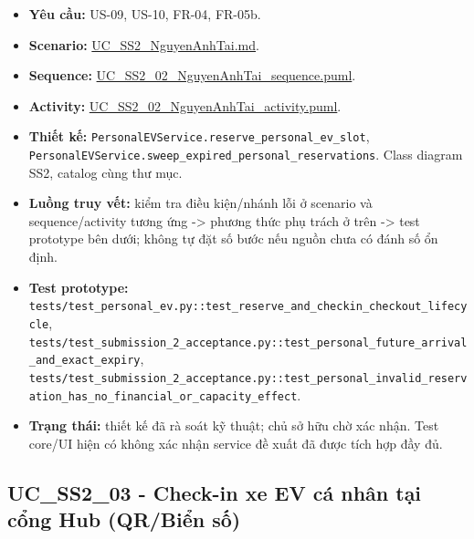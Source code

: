 \documentclass[11pt,a4paper]{article}
\providecommand{\tightlist}{%
  \setlength{\itemsep}{0pt}\setlength{\parskip}{0pt}}
\begin{document}
\begin{itemize}
\tightlist
\item
  \textbf{Yêu cầu:} US-09, US-10, FR-04, FR-05b.
\item
  \textbf{Scenario:}
  \href{../../../../docs/diagrams/Use-case\%20detail-scenario/SS2/Usecase\%20scenario/UC_SS2_NguyenAnhTai.md}{UC\_SS2\_NguyenAnhTai.md}.
\item
  \textbf{Sequence:}
  \href{../../../../docs/diagrams/Use-case\%20detail-scenario/SS2/Sequence\%20diagrams/UC_SS2_02_NguyenAnhTai_sequence.puml}{UC\_SS2\_02\_NguyenAnhTai\_sequence.puml}.
\item
  \textbf{Activity:}
  \href{../../../../docs/diagrams/Use-case\%20detail-scenario/SS2/Activity\%20diagrams/UC_SS2_02_NguyenAnhTai_activity.puml}{UC\_SS2\_02\_NguyenAnhTai\_activity.puml}.
\item
  \textbf{Thiết kế:}
  \texttt{PersonalEVService.reserve\_personal\_ev\_slot},
  \texttt{PersonalEVService.sweep\_expired\_personal\_reservations}.
  Class diagram SS2, catalog cùng thư mục.
\item
  \textbf{Luồng truy vết:} kiểm tra điều kiện/nhánh lỗi ở scenario và
  sequence/activity tương ứng -\textgreater{} phương thức phụ trách ở
  trên -\textgreater{} test prototype bên dưới; không tự đặt số bước nếu
  nguồn chưa có đánh số ổn định.
\item
  \textbf{Test prototype:}
  \texttt{tests/test\_personal\_ev.py::test\_reserve\_and\_checkin\_checkout\_lifecycle},
  \texttt{tests/test\_submission\_2\_acceptance.py::test\_personal\_future\_arrival\_and\_exact\_expiry},
  \texttt{tests/test\_submission\_2\_acceptance.py::test\_personal\_invalid\_reservation\_has\_no\_financial\_or\_capacity\_effect}.
\item
  \textbf{Trạng thái:} thiết kế đã rà soát kỹ thuật; chủ sở hữu chờ xác
  nhận. Test core/UI hiện có không xác nhận service đề xuất đã được tích
  hợp đầy đủ.
\end{itemize}

\hypertarget{uc_ss2_03---check-in-xe-ev-cuxe1-nhuxe2n-tux1ea1i-cux1ed5ng-hub-qrbiux1ec3n-sux1ed1}{%
\subsection{UC\_SS2\_03 - Check-in xe EV cá nhân tại cổng Hub (QR/Biển
số)}\label{uc_ss2_03---check-in-xe-ev-cuxe1-nhuxe2n-tux1ea1i-cux1ed5ng-hub-qrbiux1ec3n-sux1ed1}}
\end{document}
